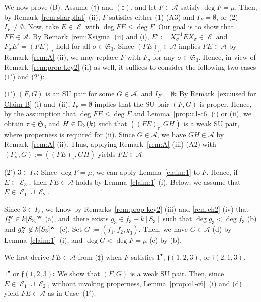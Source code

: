 \documentclass{amsart}
\theoremstyle{plain}
\theoremstyle{definition}
\newcommand{\A}{\mathcal{A}}
\newcommand{\E }{{\mathop{\mathcal{E}}\nolimits}}
\newcommand{\nd}{\noindent}
\newcommand{\w}{{\bf w}}
\newcommand{\sym}{\mathfrak{S}}
\begin{document}
We now prove (B). 
Assume ($\dag $) and $(\ddag )$, 
and let $F\in \A $ satisfy $\deg F=\mu $. 
Then, by Remark~\ref{rem:sharpflat} (ii), 
$F$ satisfies either 
(1) (A3) and $I_F=\emptyset $, or (2) $I_F\ne \emptyset $. 
Now, 
take $E\in \E $ with $\deg FE\le \deg F$. 
Our goal is to show that 
$FE\in \A $. 
By Remark~\ref{rem:Xsigma} (ii) and (i), 
$E':=X_\sigma ^{-1}EX_\sigma \in \E $ 
and $F_\sigma E'=(FE)_\sigma $ 
hold for all $\sigma \in \sym _3$. 
Since $(FE)_\sigma \in \A $ implies $FE\in \A $ 
by Remark~\ref{rem:A} (ii), 
we may replace $F$ with $F_\sigma $ 
for any $\sigma \in \sym _3$. 
Hence, in view of Remark~\ref{rem:prop key2} (ii) as well, 
it suffices to consider 
the following two cases ($1'$) and ($2'$): 


\smallskip 


\nd ($1'$) 
\underline{$(F,G)$ is an SU pair for some $G\in \mathcal{A}$, 
and $I_F=\emptyset $}\textbf{:} 
By Remark~\ref{exc:used for Claim B} (i) and~(ii), 
$I_F=\emptyset $ implies 
that the SU pair $(F,G)$ is proper. 
Hence, by the assumption that $\deg FE\le \deg F$ 
and Lemma~\ref{prop:c1-c6} (i) or (ii), 
we obtain 
$\tau \in \sym _3$ 
and $H\in {\rm D}_3(k)$ such that 
$((FE)_\tau ,GH)$ is a weak SU pair, 
where properness is required for (ii). 
Since $G\in \A $, 
we have $GH\in \A $ by Remark~\ref{rem:A} (ii). 
Thus, 
applying Remark~\ref{rem:A} (iii) (A2) 
with $(F_\sigma ,G):=((FE)_\tau ,GH)$ 
yields $FE\in \A $. 


\smallskip 


\nd 
($2'$) 
\underline{$3\in I_F$}\textbf{:} 
Since $\deg F=\mu $, 
we can apply Lemma~\ref{claim:1} to $F$. 
Hence, 
if $E\in \E _3$, 
then $FE\in \A $ holds by Lemma~\ref{claim:1} (i). 
Below, we assume that $E\in \E _1\cup \E _2$. 



Since $3\in I_F$, 
we know by Remarks~\ref{rem:prop key2} (iii) and \ref{rem:ch2} (iv) 
that $f_3^{\w }\in k[S_3]^{\w }$ (a), 
and~there exists $g_3\in f_3+k[S_3]$ 
such that $\deg g_3<\deg f_3$ (b) and $g_3^{\w }\not\in k[S_3]^{\w }$~(c). 
Set $G:=(f_1,f_2,g_3)$. 
Then, we have 
$G\in \A $ (d) by Lemma~\ref{claim:1}~(i), 
and $\deg G<\deg F=\mu $ (e) by (b). 


\smallskip 


We first derive $FE\in \A $ from ($\ddag $) 
when $F$ satisfies 
$1^{\bullet }$, 
$\mathfrak{f}(1,2,3)$, 
or $\mathfrak{f}(2,1,3)$. 


\nd $1^\bullet $ or $\mathfrak{f}(1,2,3)$\textbf{:} 
We show that $(F,G)$ is a weak SU pair. 
Then, 
since $E\in \E _1\cup \E _2$, 
without invoking properness, 
Lemma~\ref{prop:c1-c6}~(i) and (d) 
yield $FE\in \A $ as in Case~($1'$). 
\end{document}
